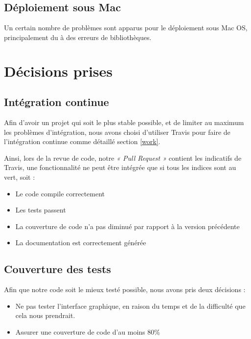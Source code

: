 \documentclass[12pt,a4paper,openany]{article}
\begin{document}
	\subsection{Déploiement sous Mac}
	Un certain nombre de problèmes sont apparus pour le déploiement sous Mac OS, principalement du à des erreurs de bibliothèques.

	\section{Décisions prises}
	\subsection{Intégration continue}
	Afin d'avoir un projet qui soit le plus stable possible, et de limiter au maximum les problèmes d'intégration, nous avons choisi d'utiliser
	Travis pour faire de l'intégration continue comme détaillé section \ref{work}.

	Ainsi, lors de la revue de code, notre \textit{« Pull Request »} contient les indicatifs de Travis, une fonctionnalité ne peut être intégrée que si tous les
	indices sont au vert, soit : 
	\begin{itemize}
		\item Le code compile correctement
		\item Les tests passent
		\item La couverture de code n'a pas diminué par rapport à la version précédente
		\item La documentation est correctement générée
	\end{itemize}

	\subsection{Couverture des tests}
	Afin que notre code soit le mieux testé possible, nous avons pris deux décisions : 
	\begin{itemize}
		\item Ne pas tester l'interface graphique, en raison du temps et de la difficulté que cela nous prendrait.
		\item Assurer une couverture de code d'au moins 80\%
	\end{itemize}
\end{document}
